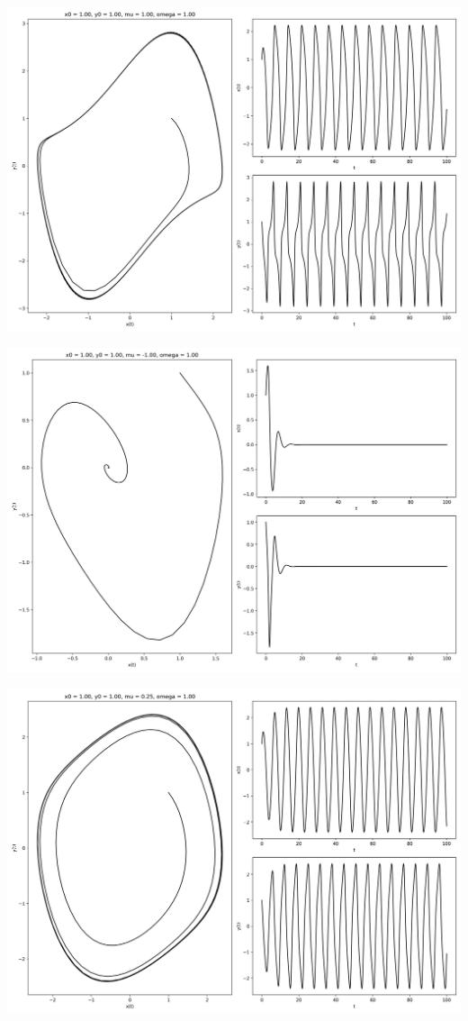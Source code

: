 \documentclass[12pt,a4paper]{jsarticle}
\makeatletter
\def\figcaption{\def\@captype{figure}\caption}
\makeatother
\begin{document}
\includegraphics[draft, scale=0.33]{x1_0y1_0mu1_0omega1_0.png}
\figcaption{$x_0=1.00, y_0=1.00, \mu=1.00, \omega=1.00$}
\includegraphics[draft, scale=0.33]{x1_0y1_0mu-1_0omega1_0.png}
\figcaption{$x_0=1.00, y_0=1.00, \mu=-1.00, \omega=1.00$}
\includegraphics[draft, scale=0.33]{x1_0y1_0mu0_2omega1_0.png}
\end{document}
